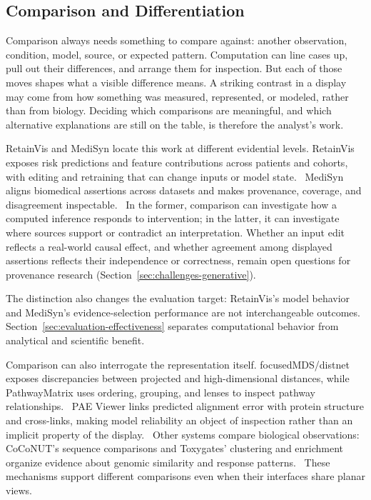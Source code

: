 \subsection{Comparison and Differentiation}
\label{sec:tasks-comparison}

Comparison always needs something to compare against: another observation, condition, model, source, or expected pattern. Computation can line cases up, pull out their differences, and arrange them for inspection. But each of those moves shapes what a visible difference means. A striking contrast in a display may come from how something was measured, represented, or modeled, rather than from biology. Deciding which comparisons are meaningful, and which alternative explanations are still on the table, is therefore the analyst's work.

RetainVis and MediSyn locate this work at different evidential levels. RetainVis exposes risk predictions and feature contributions across patients and cohorts, with editing and retraining that can change inputs or model state.~\cite{AnchorRetainVis} MediSyn aligns biomedical assertions across datasets and makes provenance, coverage, and disagreement inspectable.~\cite{AnchorMediSyn} In the former, comparison can investigate how a computed inference responds to intervention; in the latter, it can investigate where sources support or contradict an interpretation. Whether an input edit reflects a real-world causal effect, and whether agreement among displayed assertions reflects their independence or correctness, remain open questions for provenance research (Section~\ref{sec:challenges-generative}).

The distinction also changes the evaluation target: RetainVis's model behavior and MediSyn's evidence-selection performance are not interchangeable outcomes. Section~\ref{sec:evaluation-effectiveness} separates computational behavior from analytical and scientific benefit.

Comparison can also interrogate the representation itself. focusedMDS/distnet exposes discrepancies between projected and high-dimensional distances, while PathwayMatrix uses ordering, grouping, and lenses to inspect pathway relationships.~\cite{ExpandedE34,ExpandedE37} PAE Viewer links predicted alignment error with protein structure and cross-links, making model reliability an object of inspection rather than an implicit property of the display.~\cite{ExpandedE49} Other systems compare biological observations: CoCoNUT's sequence comparisons and Toxygates' clustering and enrichment organize evidence about genomic similarity and response patterns.~\cite{ExpandedE35,ExpandedE36} These mechanisms support different comparisons even when their interfaces share planar views.

